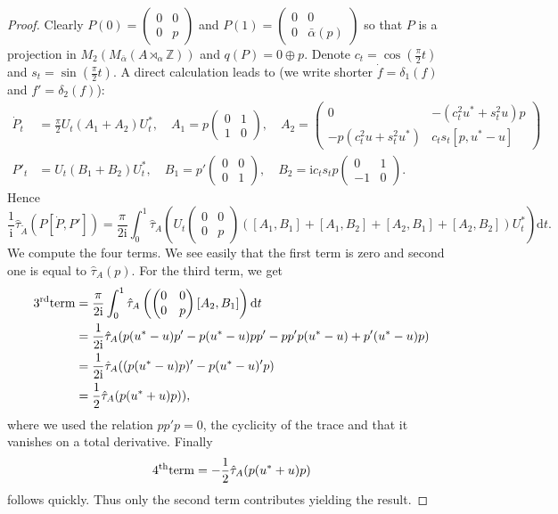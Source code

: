 \documentclass[10pt,a4paper]{amsart}
\begin{document}
\begin{proof} 
Clearly $P(0)=\begin{pmatrix}
		0 & 0\\
		0 & p
	\end{pmatrix}$ and $P(1)=\begin{pmatrix}
		0 & 0\\
		0 & \bar{\alpha}(p)
	\end{pmatrix}$ so that $P$ is a projection in $M_2(M_{\bar{\alpha}}(A \rtimes_\alpha \mathbb{Z}))$ and $q(P)=0 \oplus p$. 
	Denote $c_t=\cos{(\frac{\pi}{2}t)}$ and $s_t=\sin{(\frac{\pi}{2}t)}$. A direct calculation leads to (we write shorter $\dot f=\delta_1(f)$ and $f' = \delta_2(f)$): 
	\begin{align*} 
		\dot{P}_t &=  \frac{\pi}{2}U_t (A_1+A_2)U_t^*,\quad A_1=p\begin{pmatrix}
			0 & 1\\ 
			1 & 0
		\end{pmatrix}, \quad A_2=\begin{pmatrix}
			0 & -(c_t^2u^*+s_t^2u)p\\ 
			-p(c_t^2u+s_t^2u^*) & c_t s_t[p,u^*-u]
		\end{pmatrix}\\
		P'_t &= U_t (B_1+B_2)U_t^*,\quad B_1=p'\begin{pmatrix}
			0 & 0\\ 
			0 & 1
		\end{pmatrix}, \quad B_2=\mathrm{i}c_t s_t p\begin{pmatrix}
			0 & 1\\ 
			-1 & 0
		\end{pmatrix}.
	\end{align*}
	Hence
	$$\frac{1}{\mathrm{i}}\hat{\tau}_{\tilde{A}}(P[\dot{P}, P'])=\frac{\pi}{2\mathrm{i}}\int_0^1\hat{\tau}_A\left( U_t \begin{pmatrix}
		0 & 0\\ 0 & p
	\end{pmatrix} ([A_1,B_1]+ [A_1,B_2]+[A_2,B_1]+[A_2,B_2])U_t^*\right)\mathrm{d}t.$$
	We compute the four terms. We see easily that the first term is zero and second one is equal to $\hat{\tau}_A(p)$. For the third term, we get
	\begin{align*}
		\mathrm{3\textsuperscript{rd} term}&= \frac{\pi}{2\mathrm{i}}\int_0^1\hat{\tau}_A\left( \begin{pmatrix}
			0 & 0\\ 0 & p
		\end{pmatrix} [A_2,B_1]\right)\mathrm{d}t\\ &= 
		\frac{1}{2\mathrm{i}}\hat{\tau}_A(p(u^*-u)p'-p(u^*-u)pp'-pp'p(u^*-u)+p'(u^*-u)p)\\
		&= \frac{1}{2\mathrm{i}}\hat{\tau}_A((p(u^*-u)p)'-p(u^*-u)'p)\\
		&= \frac{1}{2}\hat{\tau}_A(p(u^*+u)p)),
	\end{align*}
	where we used the relation $pp'p=0$, the cyclicity of the trace and that it vanishes on a total derivative. 
	Finally
	$$\mathrm{4\textsuperscript{th} term}=-\frac{1}{2}\hat{\tau}_A(p(u^*+u)p)$$
	follows quickly. Thus only the second term contributes yielding the result.
\end{proof}
\end{document}
